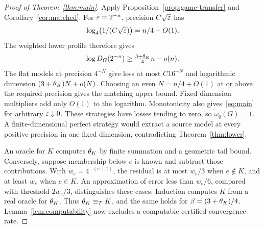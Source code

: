 \begin{proof}[Proof of Theorem~\ref{thm:main}]
Apply Proposition~\ref{prop:game-transfer} and Corollary~\ref{cor:matched}. For $\varepsilon=2^{-n}$, precision $C\sqrt{\varepsilon}$ has
\[
 \log_4\bigl(1/(C\sqrt{\varepsilon})\bigr)=n/4+O(1).
\]
The weighted lower profile therefore gives
\[
 \log D_G(2^{-n})\ge\tfrac{3+\theta_K}{4}n-o(n).
\]
The flat models at precision $4^{-N}$ give loss at most $C16^{-N}$ and logarithmic dimension $(3+\theta_K)N+o(N)$. Choosing an even $N=n/4+O(1)$ at or above the required precision gives the matching upper bound. Fixed dimension multipliers add only $O(1)$ to the logarithm. Monotonicity also gives~\eqref{eq:main} for arbitrary $\varepsilon\downarrow0$. These strategies have losses tending to zero, so $\omega_q(G)=1$. A finite-dimensional perfect strategy would extract a source model at every positive precision in one fixed dimension, contradicting Theorem~\ref{thm:lower}.

An oracle for $K$ computes $\theta_K$ by finite summation and a geometric tail bound. Conversely, suppose membership below $e$ is known and subtract those contributions. With $w_e=4^{-(e+1)}$, the residual is at most $w_e/3$ when $e\notin K$, and at least $w_e$ when $e\in K$. An approximation of error less than $w_e/6$, compared with threshold $2w_e/3$, distinguishes these cases. Induction computes $K$ from a real oracle for $\theta_K$. Thus $\theta_K\equiv_TK$, and the same holds for $\beta=(3+\theta_K)/4$. Lemma~\ref{lem:computability} now excludes a computable certified convergence rate.
\end{proof}
